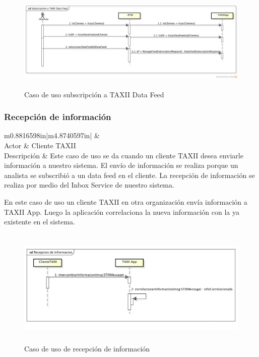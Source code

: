 \begin{figure}[H]
	\centering
	\includegraphics[width=5.4217in,height=1.8965in]{Analisis22-img/Analisis22-img027.png}
	\caption{Caso de uso subscripción a TAXII Data Feed}
	\label{fig.subscripciontaxiidatafeed}

\end{figure}

\subsubsection{Recepción de información}
\begin{flushleft}
	\tablefirsthead{}
	\tablehead{}
	\tabletail{}
	\tablelasttail{}
	\begin{supertabular}{m{0.8816598in}|m{4.8740597in}|}
		 &
		\\\hline
		{Actor} &
		{Cliente TAXII}\\
		{Descripción} &
		{Este caso de uso se da cuando un cliente TAXII desea enviarle información a
			nuestro sistema. El envío de información se realiza porque un analista se subscribió a un data feed en el cliente. La
			recepción de información se realiza por medio del Inbox Service de nuestro sistema.}\\\hhline{~-}
	\end{supertabular}
\end{flushleft}

\bigskip
	En este caso de uso un cliente TAXII en otra organización envía información a TAXII App. Luego la aplicación
	correlaciona la nueva información con la ya existente en el sistema.
	
\begin{figure}[H]
	\centering
	\includegraphics[width=5.7638in,height=2.2256in]{Analisis22-img/Analisis22-img028.png} 
	\caption{Caso de uso de recepción de información}
	\label{fig.recepcioninfo}
\end{figure}

